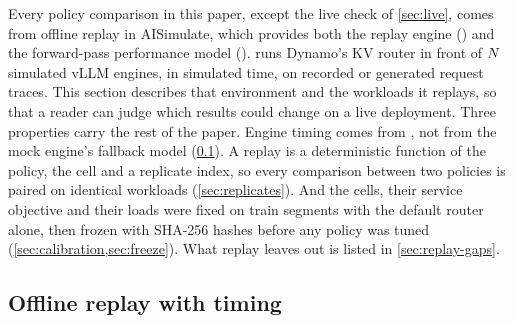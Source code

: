 Every policy comparison in this paper, except the live check of \cref{sec:live}, comes from offline
replay in AISimulate, which provides both the replay engine (\aisim{}) and the forward-pass
performance model (\ais{}).
\aisim{} runs Dynamo's KV router in front of $N$ simulated vLLM engines, in simulated time, on recorded or generated request traces. This section describes that
environment and the workloads it replays, so that a reader can judge which results could change on
a live deployment. Three properties carry the rest of the paper. Engine timing comes from \ais{},
not from the mock engine's fallback model (\cref{sec:aisim}). A replay is a deterministic function of the policy, the cell
and a replicate index, so every comparison between two policies is paired on identical workloads
(\cref{sec:replicates}). And the cells, their service objective and their loads were fixed on
train segments with the default router alone, then frozen with SHA-256 hashes before any policy
was tuned (\cref{sec:calibration,sec:freeze}). What replay leaves out is listed in
\cref{sec:replay-gaps}.

\subsection{Offline replay with \ais{} timing}
\label{sec:aisim}

